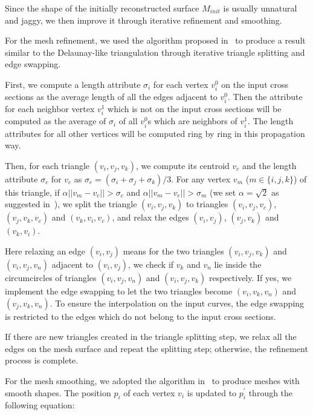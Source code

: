 Since the shape of the initially reconstructed surface $M_{init}$ is usually unnatural and jaggy, we then improve it through iterative refinement and smoothing.

For the mesh refinement, we used the algorithm proposed in~\cite{LP03} to produce a result similar to the Delaunay-like triangulation through iterative triangle splitting and edge swapping.

First, we compute a length attribute $\sigma_i$ for each vertex $v^0_i$ on the input cross sections as the average length of all the edges adjacent to $v^0_i$. Then the attribute for
each neighbor vertex $v^1_i$ which is not on the input cross sections will
be computed as the average of $\sigma_i$ of all $v^0_i$s which are neighbors of $v^1_i$.
The length attributes for all other vertices will be computed ring by ring in
this propagation way.

Then, for each triangle $(v_i, v_j, v_k)$, we compute its centroid $v_c$ and the
length attribute $\sigma_c$ for $v_c$ as
$\sigma_c= (\sigma_i + \sigma_j + \sigma_k)/3$. For any vertex $v_m$ ($m \in \{i,j,k\}$)
of this triangle, if $\alpha ||v_m-v_c||> \sigma_c$ and $\alpha ||v_m-v_c||> \sigma_m$
(we set $\alpha=\sqrt{2}$ as suggested in~\cite{LP03}),
we split the triangle $(v_i, v_j, v_k)$ to triangles $(v_i, v_j, v_c)$,
$(v_j, v_k, v_c)$ and $(v_k, v_i, v_c)$, and relax the edges $(v_i, v_j)$, $(v_j, v_k)$
and $(v_k, v_i)$.

Here relaxing an edge $(v_i, v_j)$ means for the two triangles $(v_i, v_j, v_k)$ and
$(v_i, v_j, v_n)$ adjacent to $(v_i, v_j)$, we check if $v_k$ and $v_n$ lie inside
the circumcircles of triangles $(v_i, v_j, v_n)$ and $(v_i, v_j, v_k)$ respectively.
If yes, we implement the edge swapping to let the two triangles become
$(v_i, v_k, v_n)$ and $(v_j, v_k, v_n)$. To ensure the interpolation on the input curves,
the edge swapping is restricted to the edges which do not belong to the input cross sections.

If there are new triangles created in the triangle splitting step, we relax all the edges
on the mesh surface and repeat the splitting step; otherwise, the refinement process is complete.


For the mesh smoothing, we adopted the algorithm in~\cite{YB02} to produce meshes
with smooth shapes. The position $p_i$ of each vertex $v_i$ is updated to $p^\prime_i$
through the following equation:

